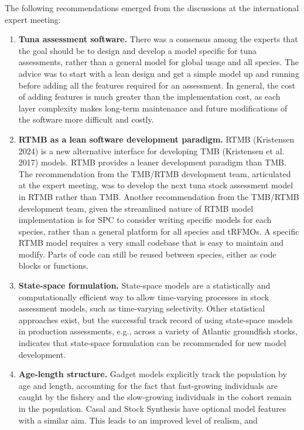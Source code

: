 \documentclass{SCreport}
\begin{document}
The following recommendations emerged from the discussions at the international
expert meeting:

\begin{enumerate}
  \item \textbf{Tuna assessment software.} There was a consensus among the
  experts that the goal should be to design and develop a model specific for
  tuna assessments, rather than a general model for global usage and all
  species. The advice was to start with a lean design and get a simple model up
  and running before adding all the features required for an assessment. In
  general, the cost of adding features is much greater than the implementation
  cost, as each layer complexity makes long-term maintenance and future
  modifications of the software more difficult and costly.
  \item \textbf{RTMB as a lean software development paradigm.} RTMB (Kristensen
  2024) is a new alternative interface for developing TMB (Kristensen et al.
  2017) models. RTMB provides a leaner development paradigm than TMB. The
  recommendation from the TMB/RTMB development team, articulated at the expert
  meeting, was to develop the next tuna stock assessment model in RTMB rather
  than TMB. Another recommendation from the TMB/RTMB development team, given the
  streamlined nature of RTMB model implementation is for SPC to consider writing
  specific models for each species, rather than a general platform for all
  species and tRFMOs. A specific RTMB model requires a very small codebase that
  is easy to maintain and modify. Parts of code can still be reused between
  species, either as code blocks or functions.
  \item \textbf{State-space formulation.} State-space models are a statistically
  and computationally efficient way to allow time-varying processes in stock
  assessment models, such as time-varying selectivity. Other statistical
  approaches exist, but the successful track record of using state-space models
  in production assessments, e.g., across a variety of Atlantic groundfish
  stocks, indicates that state-space formulation can be recommended for new
  model development.
  \item \textbf{Age-length structure.} Gadget models explicitly track the
  population by age and length, accounting for the fact that fast-growing
  individuals are caught by the fishery and the slow-growing individuals in the
  cohort remain in the population. Casal and Stock Synthesis have optional model
  features with a similar aim. This leads to an improved level of realism, and

\end{enumerate}
\end{document}
